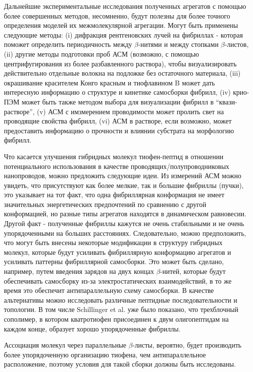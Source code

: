     Дальнейшие экспериментальные исследования полученных агрегатов с помощью более совершенных методов, несомненно, будут полезны для более точного определения моделей их межмолекулярной агрегации. Могут быть применены следующие методы: (i) дифракция рентгеновских лучей на фибриллах - которая поможет определить периодичность между $\beta$-нитями и между стопками $\beta$-листов, (ii) другие методы подготовки проб АСМ (возможно, с помощью центрифугирования из более разбавленного раствора), чтобы визуализировать действительно отдельные волокна на подложке без остаточного материала, (iii) окрашивание красителем Конго красным и тиофлавином B может дать интересную информацию о структуре и кинетике самосборки фибрилл, (iv) крио-ПЭМ может быть также методом выбора для визуализации фибрилл в ``квази-растворе'', (v)  АСМ с имзмерением проводимости может пролить свет на проводящие свойства фибрилл, (vi) АСМ в растворе, если возможно, может предоставить информацию о прочности и влиянии субстрата на морфологию фибрилл.
    
    Что касается улучшения гибридных молекул тиофен-пептид в отношении потенциального использования в качестве проводящих/полупроводниковых нанопроводов, можно предложить следующие идеи. Из измерений АСМ можно увидеть, что присутствуют как более мелкие, так и большие фибриллы (пучки), это указывает на тот факт, что одна фибриллярная конформация не имеет значительных энергетических предпочтений по сравнению с другой конформацией, но разные типы агрегатов находятся в динамическом равновесии. Другой факт - полученные фибриллы кажутся не очень стабильными и не очень упорядоченными на больших расстояниях. Следовательно, можно предположить, что могут быть внесены некоторые модификации в структуру гибридных молекул, которые будут усиливать фибриллярную конформацию агрегатов и усиливать паттерны фибриллярной самосборки. Это может быть сделано, например, путем введения зарядов на двух концах $\beta$-нитей, которые будут обеспечивать самосборку из-за электростатических взаимодействий, в то же время это обеспечит антипараллельную схему самосборки. В качестве альтернативы можно исследовать различные пептидные последовательности и топологии. В том числе Schillinger et al. \cite{schillinger_oligothiophene_2009} уже было показано, что трехблочный сополимер, в котором кватротиофен присоединен к двум олигопептидам на каждом конце, образует хорошо упорядоченные фибриллы.

   Ассоциация молекул через параллельные $\beta$-листы, вероятно, будет производить более упорядоченную организацию тиофена, чем антипараллельное расположение, поэтому условия для такой сборки должны быть исследованы.

